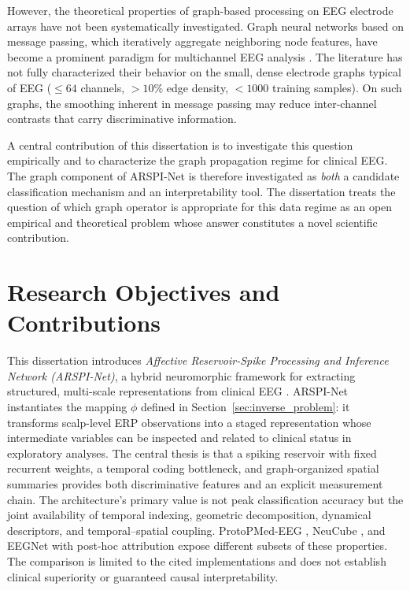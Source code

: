 However, the theoretical properties of graph-based processing on EEG electrode arrays have not been systematically investigated. Graph neural networks based on message passing, which iteratively aggregate neighboring node features, have become a prominent paradigm for multichannel EEG analysis \cite{Zhong2020EEGEmotionGCN, Song2018EEGEmotionDGCNN}. The literature has not fully characterized their behavior on the small, dense electrode graphs typical of EEG ($\leq 64$ channels, $> 10\%$ edge density, $< 1000$ training samples). On such graphs, the smoothing inherent in message passing may reduce inter-channel contrasts that carry discriminative information.

A central contribution of this dissertation is to investigate this question empirically and to characterize the graph propagation regime for clinical EEG. The graph component of ARSPI-Net is therefore investigated as \emph{both} a candidate classification mechanism and an interpretability tool. The dissertation treats the question of which graph operator is appropriate for this data regime as an open empirical and theoretical problem whose answer constitutes a novel scientific contribution.


\section{Research Objectives and Contributions}

This dissertation introduces \emph{Affective Reservoir-Spike Processing and Inference Network (ARSPI-Net)}, a hybrid neuromorphic framework for extracting structured, multi-scale representations from clinical EEG \cite{lane2023towards, lane2024towards}. ARSPI-Net instantiates the mapping $\phi$ defined in Section~\ref{sec:inverse_problem}: it transforms scalp-level ERP observations into a staged representation whose intermediate variables can be inspected and related to clinical status in exploratory analyses. The central thesis is that a spiking reservoir with fixed recurrent weights, a temporal coding bottleneck, and graph-organized spatial summaries provides both discriminative features and an explicit measurement chain. The architecture's primary value is not peak classification accuracy but the joint availability of temporal indexing, geometric decomposition, dynamical descriptors, and temporal--spatial coupling. ProtoPMed-EEG \cite{barnett_protopmed_2024}, NeuCube \cite{kasabov_neucube_2014}, and EEGNet with post-hoc attribution expose different subsets of these properties. The comparison is limited to the cited implementations and does not establish clinical superiority or guaranteed causal interpretability.

